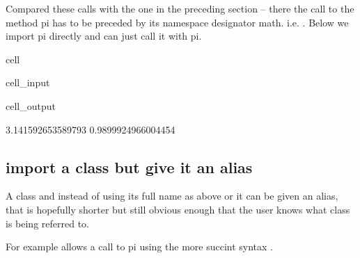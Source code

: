 \documentclass[letterpaper,10pt,english]{jupyterBook}
\begin{document}
\sphinxAtStartPar
Compared these calls with the one in the preceding section – there the call to the method pi has to be preceded by its namespace designator math.  i.e. . Below we import pi directly and can just call it with pi.

\begin{sphinxuseclass}{cell}\begin{sphinxVerbatimInput}

\begin{sphinxuseclass}{cell_input}
\begin{sphinxVerbatim}[commandchars=\\\{\}]
   

\end{sphinxVerbatim}

\end{sphinxuseclass}\end{sphinxVerbatimInput}
\begin{sphinxVerbatimOutput}

\begin{sphinxuseclass}{cell_output}
\begin{sphinxVerbatim}[commandchars=\\\{\}]
3.141592653589793
\PYGZhy{}0.9899924966004454
\end{sphinxVerbatim}

\end{sphinxuseclass}\end{sphinxVerbatimOutput}

\end{sphinxuseclass}

\subsection{import a class but give it an alias}
\label{\detokenize{content/04_PythonEssentials/PythonPandasDataframes:import-a-class-but-give-it-an-alias}}
\sphinxAtStartPar
A class and instead of using its full name as above or it can be given an alias, that is hopefully shorter but still obvious enough that the user knows what class is being referred to.

\sphinxAtStartPar
For example   allows a call to pi using the more succint syntax .
\end{document}

